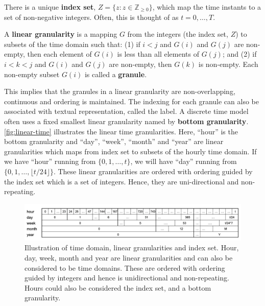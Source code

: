 \documentclass[12pt]{article}
\begin{document}
\begin{definition}\label{def:index set}
There is a unique {\bf index set}, $Z=\{z: z \in \mathbb{Z}_{\geq 0}\}$, which map the time instants to a set of non-negative integers. Often, this is thought of as $t=0, \dots, T$.
\end{definition}

\begin{definition}\label{def:linear}
A {\bf linear granularity} is a mapping $G$ from the integers (the index set, $Z$) to subsets of the time domain such that:
  (1) if $i < j$ and $G(i)$ and $G(j)$ are non-empty, then each element of $G(i)$ is less
than all elements of $G(j)$; and
  (2) if $i < k < j$ and $G(i)$ and $G(j)$ are non-empty, then $G(k)$ is non-empty.
Each non-empty subset $G(i)$ is called a {\bf granule}.
\end{definition}

\noindent This implies that the granules in a linear granularity are non-overlapping, continuous and ordering is maintained. The indexing for each granule can also be associated with textual representation, called the label. A discrete time model often uses a fixed smallest linear granularity named by \citet{Bettini1998-ed} \textbf{bottom granularity}. \autoref{fig:linear-time} illustrates the linear time granularities. Here, ``hour'' is the bottom granularity and ``day'', ``week'', ``month'' and ``year'' are linear granularities which maps from index set to subsets of the hourly time domain. If we have ``hour'' running from \(\{0, 1, \dots,t\}\), we will have ``day'' running from \(\{0, 1, \dots, \lfloor t/24\rfloor\}\). These linear granularities are ordered with ordering guided by the index set which is a set of integers. Hence, they are uni-directional and non-repeating.

\begin{figure}

{\centering \includegraphics[width=1\linewidth]{Figs/linear-ex} 

}

\caption{Illustration of time domain, linear granularities and index set. Hour, day, week, month and year are linear granularities and can also be considered to be time domains. These are ordered with ordering guided by integers and hence is unidirectional and non-repeating. Hours could also be considered the index set, and a bottom granularity.}\label{fig:linear-time}
\end{figure}
\end{document}
